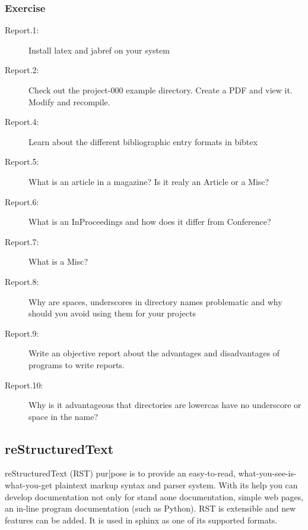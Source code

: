 \subsubsection{Exercise}
\label{\detokenize{lesson/doc/report:exercise}}\begin{description}
\item[{Report.1:}] \leavevmode
Install latex and jabref on your system

\item[{Report.2:}] \leavevmode
Check out the project-000 example directory. Create a PDF and view
it. Modify and recompile.

\item[{Report.4:}] \leavevmode
Learn about the different bibliographic entry formats in bibtex

\item[{Report.5:}] \leavevmode
What is an article in a magazine? Is it realy an Article or a Misc?

\item[{Report.6:}] \leavevmode
What is an InProceedings and how does it differ from Conference?

\item[{Report.7:}] \leavevmode
What is a Misc?

\item[{Report.8:}] \leavevmode
Why are spaces, underscores in directory names
problematic and why should you avoid using them for your projects

\item[{Report.9:}] \leavevmode
Write an objective report about the advantages and disadvantages of
programs to write reports.

\item[{Report.10:}] \leavevmode
Why is it advantageous that directories are lowercas have no
underscore or space in the name?

\end{description}


\subsection{reStructuredText}
\label{\detokenize{lesson/doc/rst:restructuredtext}}\label{\detokenize{lesson/doc/rst::doc}}
reStructuredText (RST) pur{[}pose is to provide an easy-to-read,
what-you-see-is-what-you-get plaintext markup syntax and parser
system. With its help you can develop documentation not only for stand
aone documentation, simple web pages, an in-line program documentation
(such as Python). RST is extensible and new features can be added. It
is used in sphinx as one of its supported formats.


